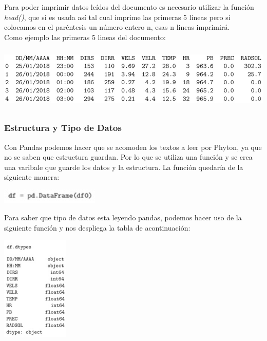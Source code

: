 \documentclass[12pt]{article}
\begin{document}
 Para poder imprimir datos leídos del documento es necesario utilizar la función \textit{head()}, que si es usada así tal cual imprime las primeras 5 lineas pero si colocamos en el paréntesis un número entero n, esas n lineas imprimirá.\\
 
 Como ejemplo las primeras 5 lineas del documento:
 \begin{center}
	\includegraphics[height=3cm]{head.jpg}
\end{center}
\subsubsection{Estructura y Tipo de Datos}
Con Pandas podemos hacer que se acomoden los textos a leer por Phyton, ya que no se saben que estructura guardan. Por lo que se utiliza una función y se crea una varibale que guarde los datos y la estructura. 
La función quedaría de la siguiente manera:
 \begin{center}
	\includegraphics[height=0.7cm]{data.jpg}
\end{center}
Para saber que tipo de datos esta leyendo pandas, podemos hacer uso de la siguiente función y nos despliega la tabla de acontinuación:
 \begin{center}
	\includegraphics[height=5cm]{tipes.jpg}
\end{center}
\end{document}
